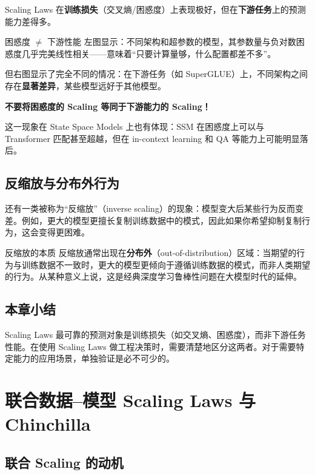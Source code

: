 \documentclass[a4paper]{article}
\begin{document}
Scaling Laws 在\textbf{训练损失}（交叉熵/困惑度）上表现极好，但在\textbf{下游任务}上的预测能力差得多。

\begin{warningbox}{困惑度 $\neq$ 下游性能}
左图显示：不同架构和超参数的模型，其参数量与负对数困惑度几乎完美线性相关——意味着``只要计算量够，什么配置都差不多''。

但右图显示了完全不同的情况：在下游任务（如 SuperGLUE）上，不同架构之间存在\textbf{显著差异}，某些模型远好于其他模型。

\textbf{不要将困惑度的 Scaling 等同于下游能力的 Scaling！}
\end{warningbox}

这一现象在 State Space Models 上也有体现：SSM 在困惑度上可以与 Transformer 匹配甚至超越，但在 in-context learning 和 QA 等能力上可能明显落后。

\subsection{反缩放与分布外行为}

还有一类被称为``反缩放''（inverse scaling）的现象：模型变大后某些行为反而变差。例如，更大的模型更擅长复制训练数据中的模式，因此如果你希望抑制复制行为，这会变得更困难。

\begin{knowledgebox}{反缩放的本质}
反缩放通常出现在\textbf{分布外}（out-of-distribution）区域：当期望的行为与训练数据不一致时，更大的模型更倾向于遵循训练数据的模式，而非人类期望的行为。从某种意义上说，这是经典深度学习鲁棒性问题在大模型时代的延伸。
\end{knowledgebox}

\subsection{本章小结}

Scaling Laws 最可靠的预测对象是训练损失（如交叉熵、困惑度），而非下游任务性能。在使用 Scaling Laws 做工程决策时，需要清楚地区分这两者。对于需要特定能力的应用场景，单独验证是必不可少的。


\section{联合数据--模型 Scaling Laws 与 Chinchilla}

\subsection{联合 Scaling 的动机}
\end{document}
